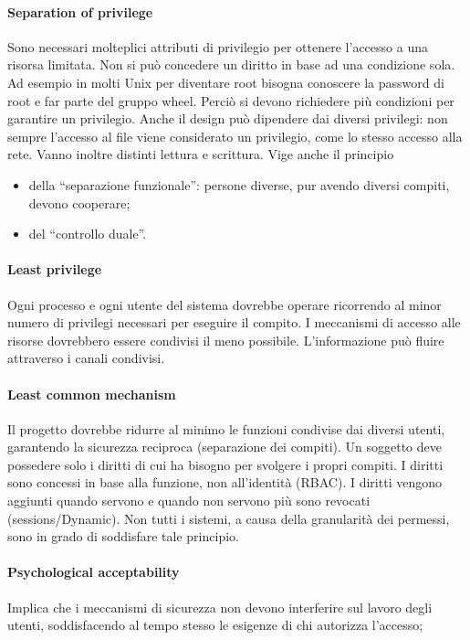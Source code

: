 \paragraph{Separation of privilege}
Sono necessari molteplici attributi di privilegio per ottenere
l'accesso a una risorsa limitata.
Non si può concedere un diritto in base ad una condizione sola.
Ad esempio in molti Unix per
diventare root bisogna conoscere la password di root e far parte del gruppo wheel.
Perciò si devono richiedere più condizioni per garantire un privilegio.
Anche il design può dipendere dai diversi privilegi: non sempre l'accesso al
file viene considerato
un privilegio, come lo stesso accesso alla rete.
Vanno inoltre distinti lettura e scrittura.
Vige anche il principio

\begin{itemize}
    \item della “separazione funzionale”: persone diverse, pur avendo diversi
          compiti, devono cooperare;
    \item del “controllo duale”.
\end{itemize}

\paragraph{Least privilege}
Ogni processo e ogni utente del sistema dovrebbe operare ricorrendo al
minor numero di privilegi necessari per eseguire il compito.
I meccanismi di accesso alle risorse dovrebbero essere condivisi il meno possibile.
L'informazione può fluire attraverso i canali condivisi.

\paragraph{Least common mechanism}
Il progetto dovrebbe ridurre al minimo le funzioni condivise dai
diversi utenti, garantendo la sicurezza reciproca (separazione dei compiti).
Un soggetto deve possedere solo i diritti di cui ha bisogno per svolgere i propri
compiti. I diritti sono concessi in base alla funzione, non all'identità (RBAC).
I diritti vengono aggiunti quando servono e quando non servono più sono revocati
(sessions/Dynamic).
Non tutti i sistemi, a causa della granularità dei permessi, sono in grado di
soddisfare tale principio.

\paragraph{Psychological acceptability}
Implica che i meccanismi di sicurezza non devono interferire
sul lavoro degli utenti, soddisfacendo al tempo stesso le esigenze di chi
autorizza l'accesso;


